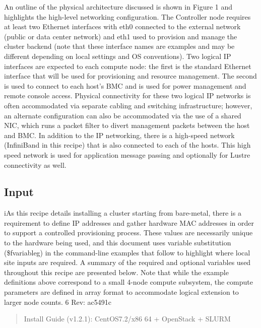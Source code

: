 \documentclass[12pt]{article}
\begin{document}
An outline of the physical architecture discussed is shown in Figure 1 and highlights the high-level
networking configuration. The Controller node requires at least two Ethernet interfaces with eth0 connected to
the external network (public or data center network) and eth1 used to provision and manage the cluster backend (note that these interface names are examples and may be different depending on local settings and OS conventions). Two logical IP interfaces are expected to each compute node: the first is the standard Ethernet interface that
will be used for provisioning and resource management. The second is used to connect to each host’s BMC
and is used for power management and remote console access. Physical connectivity for these two logical
IP networks is often accommodated via separate cabling and switching infrastructure; however, an alternate
configuration can also be accommodated via the use of a shared NIC, which runs a packet filter to divert
management packets between the host and BMC.
In addition to the IP networking, there is a high-speed network (InfiniBand in this recipe) that is also
connected to each of the hosts. This high speed network is used for application message passing and optionally
for Lustre connectivity as well.

\subsection*{Input}
iAs this recipe details installing a cluster starting from bare-metal, there is a requirement to define IP addresses and gather hardware MAC addresses in order to support a controlled provisioning process. These
values are necessarily unique to the hardware being used, and this document uses variable substitution 
(\$fvariableg) in the command-line examples that follow to highlight where local site inputs are required.
A summary of the required and optional variables used throughout this recipe are presented below. Note
that while the example definitions above correspond to a small 4-node compute subsystem, the compute
parameters are defined in array format to accommodate logical extension to larger node counts.
6 Rev: ac5491c
\begin{quote}\small Install Guide (v1.2.1): CentOS7.2/x86 64 + OpenStack + SLURM
\end{quote}
\end{document}
